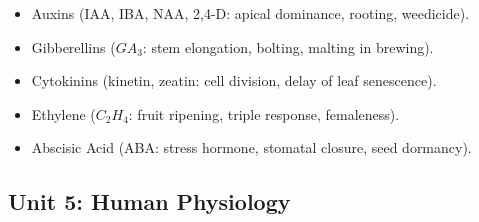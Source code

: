 \documentclass[11pt,a4paper]{article}
\begin{document}
\begin{itemize}
  \begin{itemize}
    \item Auxins (IAA, IBA, NAA, 2,4-D: apical dominance, rooting, weedicide).
    \item Gibberellins ($GA_3$: stem elongation, bolting, malting in brewing).
    \item Cytokinins (kinetin, zeatin: cell division, delay of leaf senescence).
    \item Ethylene ($C_2H_4$: fruit ripening, triple response, femaleness).
    \item Abscisic Acid (ABA: stress hormone, stomatal closure, seed dormancy).
  \end{itemize}
\end{itemize}

\subsection{Unit 5: Human Physiology}
\end{document}
